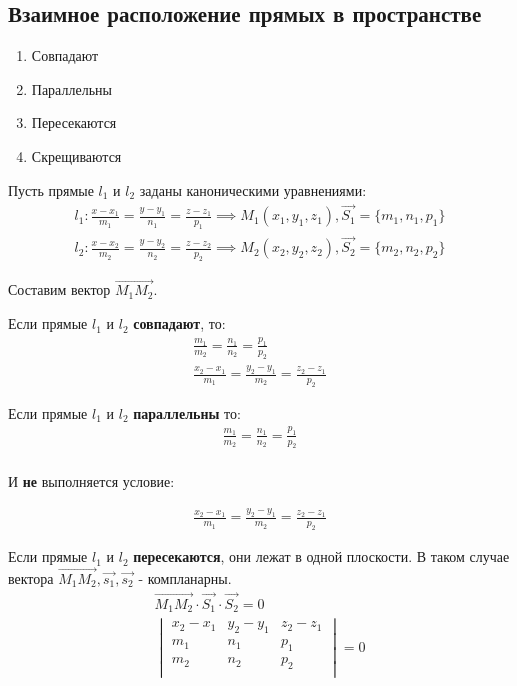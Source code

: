 \subsection{Взаимное расположение прямых в пространстве}

\begin{enumerate}
  \item Совпадают
  \item Параллельны
  \item Пересекаются
  \item Скрещиваются
\end{enumerate}

Пусть прямые $l_1$ и $l_2$ заданы каноническими уравнениями:
\begin{gather*}  
  l_1: \frac{x - x_1}{m_1} = \frac{y - y_1}{n_1} = \frac{z - z_1}{p_1} \implies M_1(x_1, y_1, z_1), \vec{S_1} = \{m_1, n_1, p_1\} \\
  l_2: \frac{x - x_2}{m_2} = \frac{y - y_2}{n_2} = \frac{z - z_2}{p_2} \implies M_2(x_2, y_2, z_2), \vec{S_2} = \{m_2, n_2, p_2\}
\end{gather*}

Составим вектор $\overrightarrow{M_1M_2}$.

Если прямые $l_1$ и $l_2$ \textbf{совпадают}, то:
\begin{gather*}
  \frac{m_1}{m_2} = \frac{n_1}{n_2} = \frac{p_1}{p_2} \\
  \frac{x_2 - x_1}{m_1} = \frac{y_2 - y_1}{m_2} = \frac{z_2 - z_1}{p_2}
\end{gather*}

Если прямые $l_1$ и $l_2$ \textbf{параллельны} то: 
\begin{gather*}
  \frac{m_1}{m_2} = \frac{n_1}{n_2} = \frac{p_1}{p_2} \\
\end{gather*}
\begin{center}
  И \textbf{не} выполняется условие:
\end{center}
\begin{gather*}
  \frac{x_2 - x_1}{m_1} = \frac{y_2 - y_1}{m_2} = \frac{z_2 - z_1}{p_2}
\end{gather*}

Если прямые $l_1$ и $l_2$ \textbf{пересекаются}, они лежат в одной плоскости.
В таком случае вектора $\overrightarrow{M_1M_2}, \vec{s_1}, \vec{s_2}$ - компланарны.
\begin{gather*}
  \overrightarrow{M_1M_2} \cdot \vec{S_1} \cdot \vec{S_2} = 0 \\
  \begin{vmatrix}
    x_2 - x_1 & y_2 - y_1 & z_2 - z_1 \\
    m_1 & n_1 & p_1 \\
    m_2 & n_2 & p_2 \\
  \end{vmatrix} = 0
\end{gather*}

